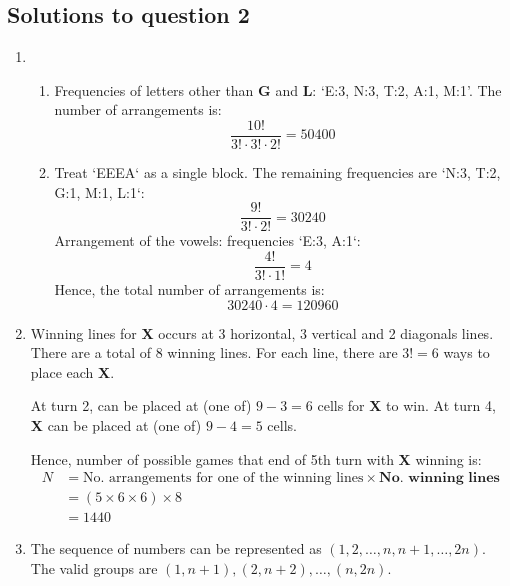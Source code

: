 \documentclass{article}
\begin{document}
\subsection*{Solutions to question 2}

\begin{enumerate}[label=(\alph*)]
    \item
          \begin{enumerate}[label=(\roman*)]
              \item Frequencies of letters other than \textbf{G} and \textbf{L}: `E:3, N:3, T:2, A:1, M:1'. The number of arrangements is:
                    \[
                        \frac{10!}{3! \cdot 3! \cdot 2!} = 50400
                    \]
              \item Treat `EEEA` as a single block. The remaining frequencies are `N:3, T:2, G:1, M:1, L:1`:
                    \[
                        \frac{9!}{3! \cdot 2!} = 30240
                    \]
                    Arrangement of the vowels: frequencies `E:3, A:1`:
                    \[
                        \frac{4!}{3! \cdot 1!} = 4
                    \]
                    Hence, the total number of arrangements is:
                    \[
                        30240 \cdot 4 = 120960
                    \]
          \end{enumerate}
    \item
          Winning lines for \textbf{X} occurs at 3 horizontal, 3 vertical and 2 diagonals lines. There are a total of $8$ winning lines. For each line, there are $3! = 6$ ways to place each \textbf{X}.

          At turn 2,  can be placed at (one of) $9-3=6$ cells for \textbf{X} to win. At turn 4, \textbf{X} can be placed at (one of) $9-4=5$ cells.

          Hence, number of possible games that end of 5th turn with \textbf{X} winning is:
          \[
              \begin{aligned}
                  N & = \text{No. arrangements for one of the winning lines} \times \textbf{No. winning lines} \\
                    & = (5 \times 6 \times 6) \times 8                                                         \\
                    & = 1440
              \end{aligned}
          \]
    \item
          The sequence of numbers can be represented as \( (1, 2, \dots, n, n+1, \dots, 2n) \). The valid groups are \( (1, n+1), (2, n+2), \dots, (n, 2n) \).


\end{enumerate}
\end{document}

